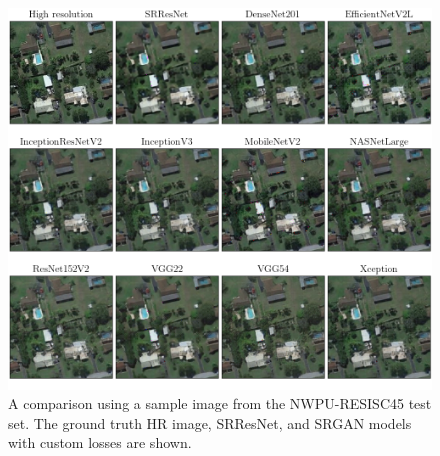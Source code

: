 \begin{figure}[ht]
    \centering
    \includegraphics[width=\linewidth]{./assets/model_comparison.png}
    \caption{A comparison using a sample image from the NWPU-RESISC45 test set. The ground truth HR image, SRResNet, and SRGAN models with custom losses are shown.}
    \label{fig:model_comparison}
\end{figure}

